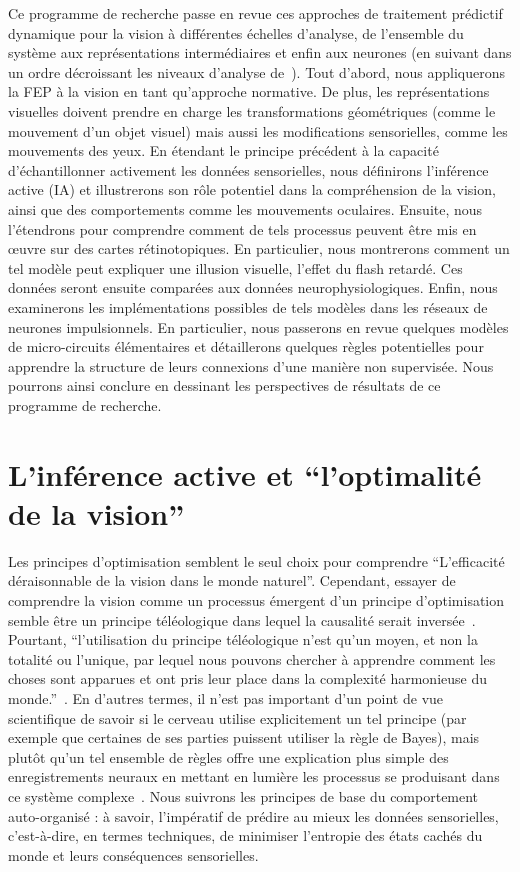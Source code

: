 \documentclass[11pt,french,a4paper,oneside]{article}%
\begin{document}
Ce programme de recherche passe en revue ces approches de traitement prédictif
dynamique pour la vision à différentes échelles d'analyse, de l'ensemble
du système aux représentations intermédiaires et enfin aux neurones (en
suivant dans un ordre décroissant les niveaux d'analyse de~\citet{Marr83}).
Tout d'abord, nous appliquerons la FEP à la vision en tant qu'approche
normative. De plus, les représentations visuelles doivent prendre en
charge les transformations géométriques (comme le mouvement d'un objet
visuel) mais aussi les modifications sensorielles, comme les mouvements
des yeux. En étendant le principe précédent à la capacité
d'échantillonner activement les données sensorielles, nous définirons
l'inférence active (IA) et illustrerons son rôle potentiel dans la
compréhension de la vision, ainsi que des comportements comme les
mouvements oculaires. Ensuite, nous l'étendrons pour
comprendre comment de tels processus peuvent être mis en œuvre sur des
cartes rétinotopiques. En particulier, nous montrerons
comment un tel modèle peut expliquer une illusion visuelle, l'effet du flash retardé. %
Ces données seront ensuite comparées aux données
neurophysiologiques. Enfin, nous examinerons les implémentations
possibles de tels modèles dans les réseaux de neurones impulsionnels. En particulier, nous passerons en revue quelques modèles de
micro-circuits élémentaires et détaillerons quelques règles potentielles
pour apprendre la structure de leurs connexions d'une manière non
supervisée. Nous pourrons ainsi conclure en dessinant les perspectives de résultats de ce programme de recherche.

\section{L'inférence active et ``l'optimalité de la vision''}
\label{sec:ai}
Les principes d'optimisation semblent le seul choix pour comprendre
``L'efficacité déraisonnable de la vision dans le monde naturel''.
Cependant, essayer de comprendre la vision comme un processus émergent
d'un principe d'optimisation semble être un principe téléologique dans
lequel la causalité serait inversée~\citep{Turkheimer19}. Pourtant,
``l'utilisation du principe téléologique n'est qu'un moyen, et non la
totalité ou l'unique, par lequel nous pouvons chercher à apprendre
comment les choses sont apparues et ont pris leur place dans la
complexité harmonieuse du monde.''~\citep[chap. 1, ma traduction]{DArcy-Thompson17}. En
d'autres termes, il n'est pas important d'un point de vue scientifique
de savoir si le cerveau utilise explicitement un tel principe (par
exemple que certaines de ses parties puissent utiliser la règle de
Bayes), mais plutôt qu'un tel ensemble de règles offre une explication
plus simple des enregistrements neuraux en mettant en lumière les
processus se produisant dans ce système complexe~\citep{Varoquaux19}.
Nous suivrons les principes de base du comportement auto-organisé
: à savoir, l'impératif de prédire au mieux les données sensorielles,
c'est-à-dire, en termes techniques, de minimiser l'entropie des états
cachés du monde et leurs conséquences sensorielles.
\end{document}
